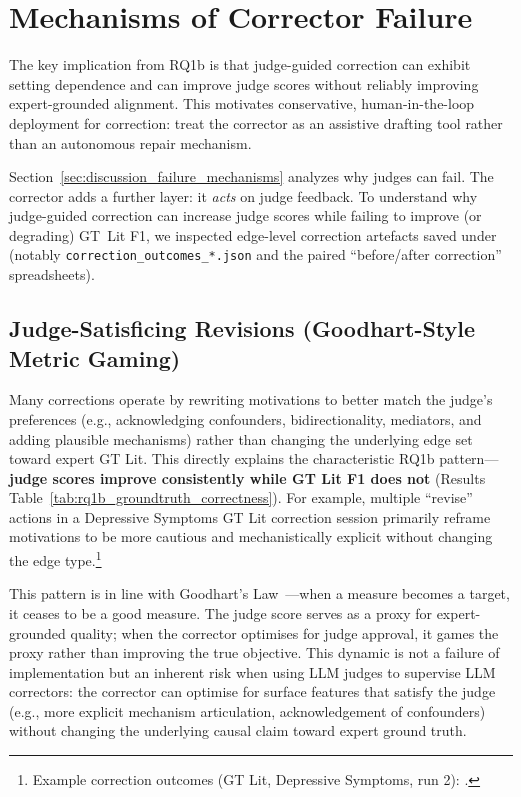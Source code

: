 \section{Mechanisms of Corrector Failure}
\label{sec:discussion_rq1b}
\label{sec:discussion_corrector_failure_mechanisms}

The key implication from RQ1b is that judge-guided correction can exhibit setting dependence and can improve judge scores without reliably improving expert-grounded alignment. This motivates conservative, human-in-the-loop deployment for correction: treat the corrector as an assistive drafting tool rather than an autonomous repair mechanism.

Section~\ref{sec:discussion_failure_mechanisms} analyzes why judges can fail. The corrector adds a further layer: it \emph{acts} on judge feedback. To understand why judge-guided correction can increase judge scores while failing to improve (or degrading) GT~Lit F1, we inspected edge-level correction artefacts saved under \texttt{} (notably \texttt{correction\_outcomes\_*.json} and the paired ``before/after correction'' spreadsheets).

\subsection{Judge-Satisficing Revisions (Goodhart-Style Metric Gaming)}
Many corrections operate by rewriting motivations to better match the judge's preferences (e.g., acknowledging confounders, bidirectionality, mediators, and adding plausible mechanisms) rather than changing the underlying edge set toward expert GT Lit. This directly explains the characteristic RQ1b pattern---\textbf{judge scores improve consistently while GT Lit F1 does not} (Results Table~\ref{tab:rq1b_groundtruth_correctness}). For example, multiple ``revise'' actions in a Depressive Symptoms GT Lit correction session primarily reframe motivations to be more cautious and mechanistically explicit without changing the edge type.\footnote{Example correction outcomes (GT Lit, Depressive Symptoms, run 2): .}

This pattern is in line with Goodhart's Law~\citep{goodhart1984problems}---when a measure becomes a target, it ceases to be a good measure. The judge score serves as a proxy for expert-grounded quality; when the corrector optimises for judge approval, it games the proxy rather than improving the true objective. This dynamic is not a failure of implementation but an inherent risk when using LLM judges to supervise LLM correctors: the corrector can optimise for surface features that satisfy the judge (e.g., more explicit mechanism articulation, acknowledgement of confounders) without changing the underlying causal claim toward expert ground truth.

